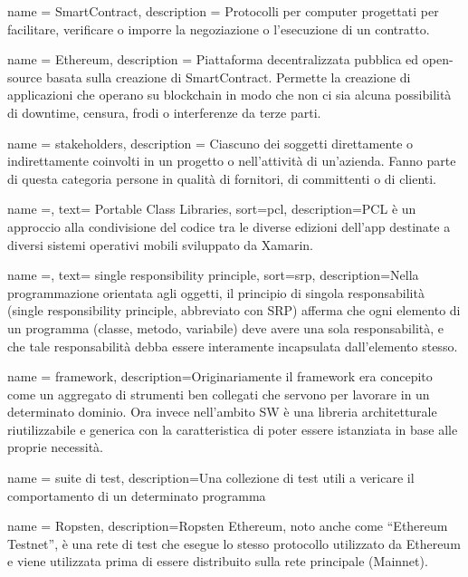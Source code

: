 {
	name = {SmartContract},
	description = { Protocolli per computer progettati per facilitare, verificare o imporre la negoziazione o l'esecuzione di un
			contratto.
		}
}

{
	name = {Ethereum},
	description = { Piattaforma decentralizzata pubblica ed open-source basata sulla creazione di
			SmartContract. Permette la creazione di applicazioni che operano su blockchain
			in modo che non ci sia alcuna possibilità di downtime, censura, frodi o interferenze
			da terze parti.
		}
}

{
	name = {stakeholders},
	description = { Ciascuno dei soggetti direttamente o indirettamente coinvolti in un progetto o nell'attività di un'azienda.
			Fanno parte di questa categoria persone in qualità di fornitori, di committenti o di clienti.
		}
}



{
    name =,
    text= Portable Class Libraries,
    sort=pcl,
    description={PCL è un approccio alla condivisione del codice tra le diverse edizioni dell’app destinate a diversi sistemi operativi mobili sviluppato da Xamarin.}
}


{
    name =,
    text= single responsibility principle,
    sort=srp,
    description={Nella programmazione orientata agli oggetti, il principio di singola responsabilità (single responsibility principle, abbreviato con SRP) afferma che ogni elemento di un programma (classe, metodo, variabile) deve avere una sola responsabilità, e che tale responsabilità debba essere interamente incapsulata dall'elemento stesso.}
}


{
    name = {framework},
    description={Originariamente il framework era concepito come un aggregato di strumenti ben collegati che servono per lavorare in un determinato dominio. Ora invece nell’ambito SW è una libreria architetturale riutilizzabile e generica con la caratteristica di poter essere istanziata in base alle proprie necessità. }
}

{
    name = {suite di test},
    description={Una collezione di test utili a vericare il comportamento di un determinato programma}
}

{
    name = {Ropsten},
    description={Ropsten Ethereum, noto anche come “Ethereum Testnet”, è una rete di test che esegue lo stesso protocollo utilizzato da Ethereum e viene utilizzata prima di essere distribuito sulla rete principale (Mainnet).}
}


